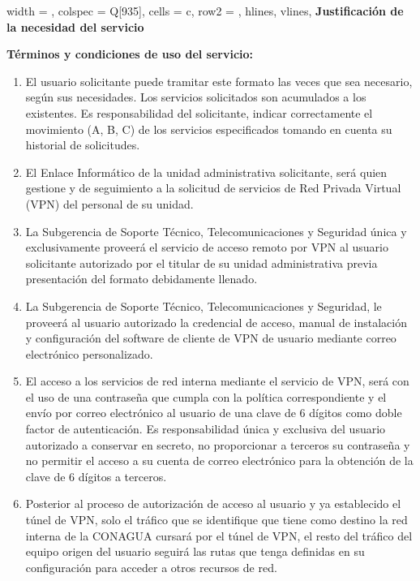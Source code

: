 \documentclass[letterpaper,11pt]{article}
\begin{document}
\vspace{-15pt}
\begin{longtblr}[
	label = none,
	entry = none,
	]{
		width = \linewidth,
		colspec = {Q[935]},
		cells = {c},
		row{2} = {},
		hlines,
		vlines,
	}
	\textbf{Justificación de la necesidad del servicio} \\\JUSTIFICACION
\end{longtblr}
\clearpage
\textbf{ \large Términos y condiciones de uso del servicio:}
{  \footnotesize\begin{enumerate}
	\item El usuario solicitante puede tramitar este formato las veces que sea necesario, según sus necesidades. Los servicios solicitados son acumulados a los existentes. Es responsabilidad del solicitante, indicar correctamente el movimiento (A, B, C) de los servicios especificados tomando en cuenta su historial de solicitudes.
	\item El Enlace Informático de la unidad administrativa solicitante, será quien gestione y de seguimiento a la solicitud de servicios de Red Privada Virtual (VPN) del personal de su unidad. 
	\item La Subgerencia de Soporte Técnico, Telecomunicaciones y Seguridad única y exclusivamente proveerá el servicio de acceso remoto por VPN al usuario solicitante autorizado por el titular de su unidad administrativa previa presentación del formato debidamente llenado.
	\item La Subgerencia de Soporte Técnico, Telecomunicaciones y Seguridad, le proveerá al usuario autorizado la credencial de acceso, manual de instalación y configuración del software de cliente de VPN de usuario mediante correo electrónico personalizado.
	\item El acceso a los servicios de red interna mediante el servicio de VPN, será con el uso de una contraseña que cumpla con la política correspondiente y el envío por correo electrónico al usuario de una clave de 6 dígitos como doble factor de autenticación. Es responsabilidad única y exclusiva del usuario autorizado a conservar en secreto, no proporcionar a terceros su contraseña y no permitir el acceso a su cuenta de correo electrónico para la obtención de la clave de 6 dígitos a terceros.
	\item Posterior al proceso de autorización de acceso al usuario y ya establecido el túnel de VPN, solo el tráfico que se identifique que tiene como destino la red interna de la CONAGUA cursará por el túnel de VPN, el resto del tráfico del equipo origen del usuario seguirá las rutas que tenga definidas en su configuración para acceder a otros recursos de red.

\end{enumerate}}
\end{document}
